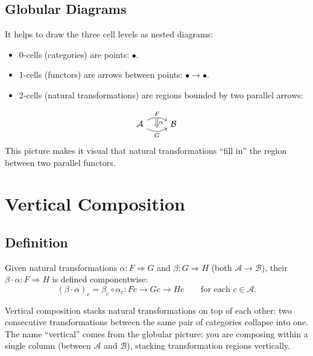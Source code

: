 \subsection{Globular Diagrams}

It helps to draw the three cell levels as nested diagrams:
\begin{itemize}
  \item 0-cells (categories) are points: $\bullet$.
  \item 1-cells (functors) are arrows between points: $\bullet \to \bullet$.
  \item 2-cells (natural transformations) are regions bounded by two
        parallel arrows:
\end{itemize}
\[
  \begin{tikzcd}
    \mathcal{A}
      \arrow[r, bend left=30, "F", ""{name=U}]
      \arrow[r, bend right=30, "G"', ""{name=D}]
    & \mathcal{B}
    \arrow[Rightarrow, from=U, to=D, "\alpha"]
  \end{tikzcd}
\]
This picture makes it visual that natural transformations ``fill in''
the region between two parallel functors.


\section{Vertical Composition}
\label{sec:vertical}

\subsection{Definition}

Given natural transformations $\alpha : F \Rightarrow G$ and $\beta :
G \Rightarrow H$ (both $\mathcal{A} \to \mathcal{B}$), their
 $\beta \cdot \alpha : F \Rightarrow H$ is
defined componentwise:
\[
  (\beta \cdot \alpha)_c = \beta_c \circ \alpha_c : Fc \to Gc \to Hc
  \qquad \text{for each } c \in \mathcal{A}.
\]

\begin{dialog}
Vertical composition stacks natural transformations on top of each other:
two consecutive transformations between the same pair of categories
collapse into one. The name ``vertical'' comes from the globular picture:
you are composing within a single column (between $\mathcal{A}$ and
$\mathcal{B}$), stacking transformation regions vertically.
\end{dialog}

